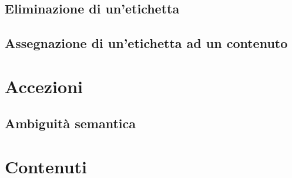 \documentclass[10pt,a4paper,headinclude,footinclude,hidelinks]{scrreprt} %
\begin{document}
	\subsection{Eliminazione di un'etichetta}

	\subsection{Assegnazione di un'etichetta ad un contenuto}

	\section{Accezioni}
	\label{sec:stage:design:accezioni}

	\subsection{Ambiguità semantica}

	\section{Contenuti}
	\label{sec:stage:design:contenuti}
\end{document}
